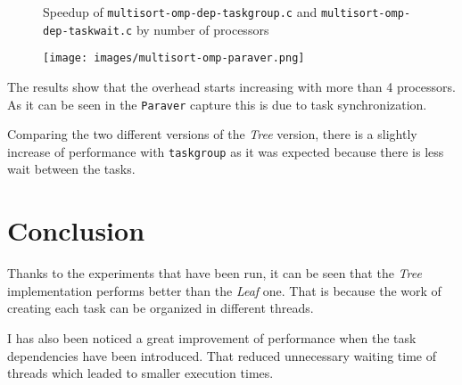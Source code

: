 \documentclass[a4paper]{article}
\newenvironment{questionenum}{%
\setlist[enumerate]{resume}
\restartlist{enumerate}
\newcommand{\question}[1]{
\begin{enumerate}
	\item\bfseries ##1
\end{enumerate}
}}{%
}
\begin{document}
\begin{questionenum}
    \begin{figure}[H]
        \centering
        \caption{Speedup of \texttt{multisort-omp-dep-taskgroup.c} and \texttt{multisort-omp-dep-taskwait.c} by number of processors}
        \label{fig:dep}
    \end{figure}
    
    \begin{figure}[H]
    	\centering
    	\texttt{[image: images/multisort-omp-paraver.png]}
    \end{figure}
    
    The results show that the overhead starts increasing with more than 4 processors. As it can be seen in the \verb|Paraver| capture this is due to task synchronization.
    
    Comparing the two different versions of the \emph{Tree} version, there is a slightly increase of performance with \verb|taskgroup| as it was expected because there is less wait between the tasks.
\end{questionenum}

\section{Conclusion}
Thanks to the experiments that have been run, it can be seen that the \emph{Tree} implementation performs better than the \emph{Leaf} one. That is because the work of creating each task can be organized in different threads.

I has also been noticed a great improvement of performance when the task dependencies have been introduced. That reduced unnecessary waiting time of threads which leaded to smaller execution times.
\end{document}
